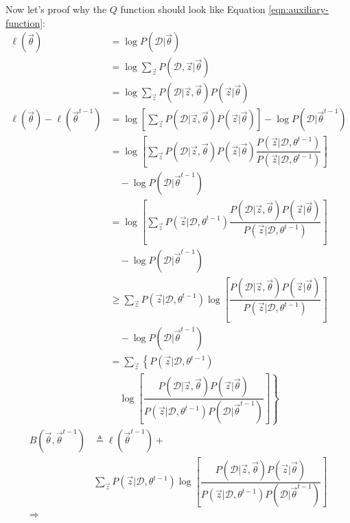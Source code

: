 Now let's proof why the $Q$ function should look like Equation \eqref{eqn:auxiliary-function}:
\begin{align}
\ell(\vec{\theta}) &= \log{P(\mathcal{D}|\vec{\theta})}  \nonumber \\
                &= \log{{\sum\limits_{\vec{z}} P(\mathcal{D},\vec{z}|\vec{\theta})}} \nonumber \\
				&= \log{{\sum\limits_{\vec{z}} P(\mathcal{D}|\vec{z},\vec{\theta})P(\vec{z}|\vec{\theta})}} \nonumber \\
\ell(\vec{\theta})-\ell(\vec{\theta}^{t-1}) &= \log\left[\sum\limits_{\vec{z}} P(\mathcal{D}|\vec{z},\vec{\theta})P(\vec{z}|\vec{\theta})\right] - \log{P(\mathcal{D}|\vec{\theta}^{t-1})} \nonumber \\
                &= \log\left[\sum\limits_{\vec{z}} P(\mathcal{D}|\vec{z},\vec{\theta})P(\vec{z}|\vec{\theta})\dfrac{P(\vec{z}|\mathcal{D},\theta^{t-1})}{P(\vec{z}|\mathcal{D},\theta^{t-1})}\right] \nonumber \\
				& \quad -\log{P(\mathcal{D}|\vec{\theta}^{t-1})} \nonumber \\
				&= \log\left[\sum\limits_{\vec{z}} P(\vec{z}|\mathcal{D},\theta^{t-1})\dfrac{P(\mathcal{D}|\vec{z},\vec{\theta})P(\vec{z}|\vec{\theta})}{P(\vec{z}|\mathcal{D},\theta^{t-1})}\right] \nonumber \\
				& \quad - \log{P(\mathcal{D}|\vec{\theta}^{t-1})} \nonumber \\
				&\geq \sum\limits_{\vec{z}} P(\vec{z}|\mathcal{D},\theta^{t-1})\log\left[\dfrac{P(\mathcal{D}|\vec{z},\vec{\theta})P(\vec{z}|\vec{\theta})}{P(\vec{z}|\mathcal{D},\theta^{t-1})}\right] \nonumber \\
				& \quad - \log{P(\mathcal{D}|\vec{\theta}^{t-1})} \nonumber \\
				&= \sum\limits_{\vec{z}} \left\{P(\vec{z}|\mathcal{D},\theta^{t-1}) \right. \nonumber \\
				& \quad \left. \log\left[\dfrac{P(\mathcal{D}|\vec{z},\vec{\theta})P(\vec{z}|\vec{\theta})}{P(\vec{z}|\mathcal{D},\theta^{t-1})P(\mathcal{D}|\vec{\theta}^{t-1})}\right]\right\} \nonumber
\end{align}
\begin{align}
B(\vec{\theta},\vec{\theta}^{t-1}) & \triangleq \ell(\vec{\theta}^{t-1})+ \nonumber \\
 & \sum\limits_{\vec{z}} P(\vec{z}|\mathcal{D},\theta^{t-1})\log\left[\dfrac{P(\mathcal{D}|\vec{z},\vec{\theta})P(\vec{z}|\vec{\theta})}{P(\vec{z}|\mathcal{D},\theta^{t-1})P(\mathcal{D}|\vec{\theta}^{t-1})}\right] \nonumber \\
\Rightarrow & \nonumber
\end{align}


